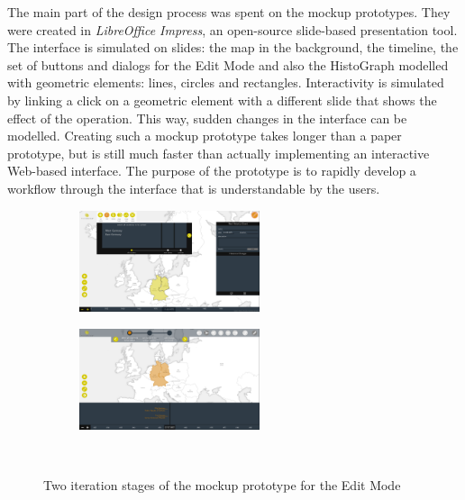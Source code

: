 The main part of the design process was spent on the mockup prototypes. They were created in \emph{LibreOffice Impress}, an open-source slide-based presentation tool. The interface is simulated on slides: the map in the background, the timeline, the set of buttons and dialogs for the Edit Mode and also the HistoGraph modelled with geometric elements: lines, circles and rectangles. Interactivity is simulated by linking a click on a geometric element with a different slide that shows the effect of the operation. This way, sudden changes in the interface can be modelled. Creating such a mockup prototype takes longer than a paper prototype, but is still much faster than actually implementing an interactive Web-based interface. The purpose of the prototype is to rapidly develop a workflow through the interface that is understandable by the users.

\begin{figure}[ht]
  \centering
  \begin{subfigure}[b]{.5\textwidth}
    \centering
    \includegraphics[width=200px]{graphics/development/design_process/mockup_prototype_1.png}
  \end{subfigure}%
  \begin{subfigure}[b]{.5\textwidth}
    \centering
    \includegraphics[width=200px]{graphics/development/design_process/mockup_prototype_3.png}
  \end{subfigure} \\[0.8em]

  \caption{Two iteration stages of the mockup prototype for the Edit Mode}
  \label{fig:mockup_prototypes}
\end{figure}

